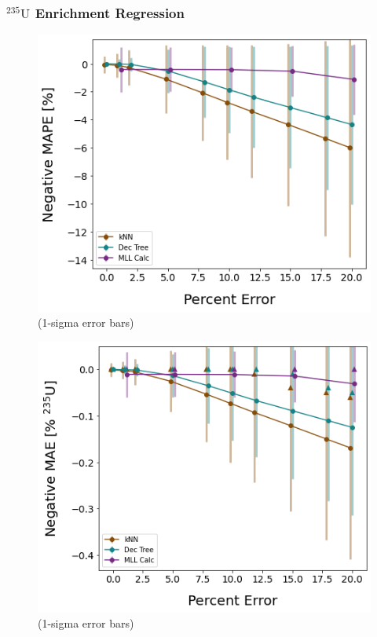 \begin{frame}
  \frametitle{${}^{235}\text{U}$ Enrichment Regression}
  \begin{adjustwidth}{-15pt}{-5pt}
  \begin{minipage}{0.5\textwidth}
    \begin{figure}
      \centering
      \includegraphics[width=\textwidth]{./figures/randerr_compare_nuc29_MAPE_enri.png}
      \scriptsize (1-sigma error bars)
    \end{figure}
  \end{minipage}%
  \hfill
  \begin{minipage}{0.5\textwidth}
    \begin{figure}
      \centering
      \includegraphics[width=1.05\textwidth]{./figures/randerr_compare_nuc29_MAE_enri.png}
      \scriptsize (1-sigma error bars)
    \end{figure}
  \end{minipage}
  \end{adjustwidth}
\end{frame}

